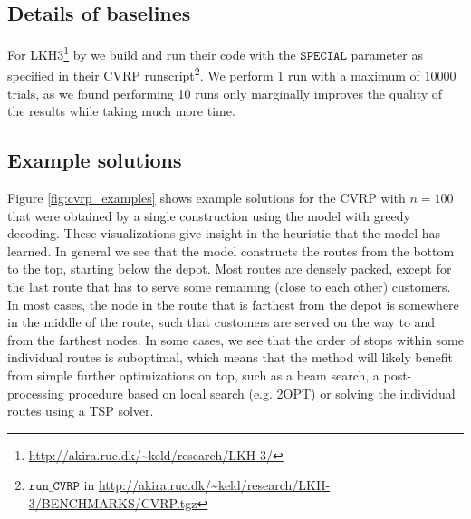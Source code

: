 \subsection{Details of baselines}
For LKH3\footnote{\url{http://akira.ruc.dk/~keld/research/LKH-3/}} by \citet{helsgaun2017extension} we build and run their code with the $\texttt{SPECIAL}$ parameter as specified in their CVRP runscript\footnote{$\texttt{run\_CVRP}$ in \url{http://akira.ruc.dk/~keld/research/LKH-3/BENCHMARKS/CVRP.tgz}}. We perform 1 run with a maximum of 10000 trials, as we found performing 10 runs only marginally improves the quality of the results while taking much more time.

\subsection{Example solutions}
\label{sec:appendix_vrp_examples}
Figure \ref{fig:cvrp_examples} shows example solutions for the CVRP with $n = 100$ that were obtained by a single construction using the model with greedy decoding. These visualizations give insight in the heuristic that the model has learned. In general we see that the model constructs the routes from the bottom to the top, starting below the depot. Most routes are densely packed, except for the last route that has to serve some remaining (close to each other) customers. In most cases, the node in the route that is farthest from the depot is somewhere in the middle of the route, such that customers are served on the way to and from the farthest nodes. In some cases, we see that the order of stops within some individual routes is suboptimal, which means that the method will likely benefit from simple further optimizations on top, such as a beam search, a post-processing procedure based on local search (e.g. 2OPT) or solving the individual routes using a TSP solver.

